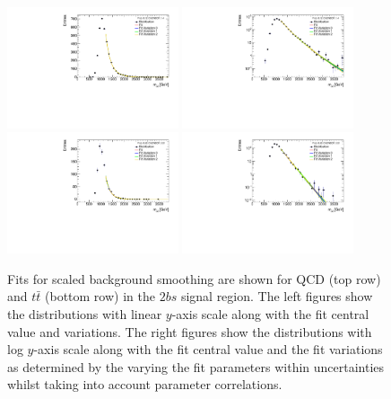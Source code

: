 \begin{figure}[htbp!]
\begin{center}
\includegraphics[angle=270, width=0.45\textwidth]{figures/boosted/Smooth/qcd_est_TwoTag_split_Signal_mHH_pole.pdf}
\includegraphics[angle=270, width=0.45\textwidth]{figures/boosted/Smooth/qcd_est_TwoTag_split_Signal_mHH_pole_l.pdf}\\
%   
\includegraphics[angle=270, width=0.45\textwidth]{figures/boosted/Smooth/ttbar_est_TwoTag_split_Signal_mHH_pole.pdf}
\includegraphics[angle=270, width=0.45\textwidth]{figures/boosted/Smooth/ttbar_est_TwoTag_split_Signal_mHH_pole_l.pdf}\\
\caption{Fits for scaled background smoothing are shown for QCD (top row) and $t\bar{t}$ (bottom row) in the $2bs$ signal region.  The left figures show the distributions with linear $y$-axis scale along with the fit central value and variations. The right figures show the  distributions with log $y$-axis scale along with the fit central value and the fit variations as determined by the varying the fit parameters within uncertainties whilst taking into account parameter correlations. }
\label{fig:signal-region-mjjscaled-2bs-smoothing}
\end{center}
\end{figure}

